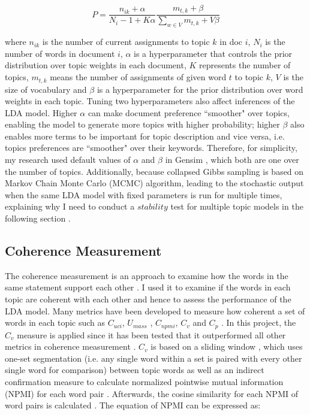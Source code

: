 \begin{equation}
  P = \frac{n_{ik} + \alpha}{N_i - 1 + K\alpha} \frac{m_{t,k} + \beta}{\sum_{w\in V}m_{t,k} + V\beta}
\end{equation}

where $n_{ik}$ is the number of current assignments to topic $k$ in doc $i$, $N_i$ is the number of words in document $i$, $\alpha$ is a hyperparameter that controls the prior distribution over topic weights in each document, $K$ represents the number of topics, $m_{t,k}$ means the number of assignments of given word $t$ to topic $k$, $V$ is the size of vocabulary and $\beta$ is a hyperparameter for the prior distribution over word weights in each topic. Tuning two hyperparameters also affect inferences of the LDA model. Higher $\alpha$ can make document preference ``smoother" over topics, enabling the model to generate more topics with higher probability; higher $\beta$ also enables more terms to be important for topic description and vice versa, i.e. topics preferences are ``smoother" over their keywords. Therefore, for simplicity, my research used default values of $\alpha$ and $\beta$ in Gensim \cite{gensim}, which both are one over the number of topics. Additionally, because collapsed Gibbs sampling is based on Markov Chain Monte Carlo (MCMC) algorithm, leading to the stochastic output when the same LDA model with fixed parameters is run for multiple times, explaining why I need to conduct a $stability$ test for multiple topic models in the following section \cite{chuang2015, Wang2019}.

\subsection{Coherence Measurement}

The coherence measurement is an approach to examine how the words in the same statement support each other \cite{aletras2013}. I used it to examine if the words in each topic are coherent with each other and hence to assess the performance of the LDA model. Many metrics have been developed to measure how coherent a set of words in each topic such as $C_{uci}$\cite{lau2014}, $U_{mass}$ \cite{Mimno2011}, $C_{npmi}$\cite{bouma2009}, $C_v$ \cite{michael2015} and $C_p$ \cite{fitelson2003}. In this project, the $C_v$ measure is applied since it has been tested that it outperformed all other metrics in coherence measurement \cite{michael2015}. $C_v$ is based on a sliding window \cite{newman2010}, which uses one-set segmentation (i.e. any single word within a set is paired with every other single word for comparison) between topic words as well as an indirect confirmation measure \cite{aletras2013} to calculate normalized pointwise mutual information (NPMI) for each word pair \cite{michael2015}. Afterwards, the cosine similarity for each NPMI of word pairs is calculated \cite{newman2010}. The equation of NPMI can be expressed as:

